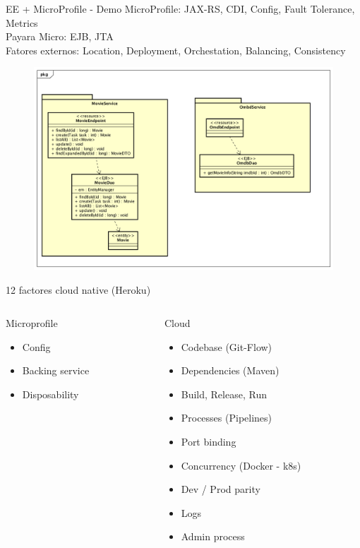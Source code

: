 \documentclass[aspectratio=169]{beamer}
\begin{document}
\begin{frame}{EE + MicroProfile - Demo}
\footnotesize MicroProfile: JAX-RS, CDI, Config, Fault Tolerance, Metrics\\
Payara Micro: EJB, JTA\\
Fatores externos: Location, Deployment, Orchestation, Balancing, Consistency
\begin{figure}
\centering
\includegraphics[width=0.65\linewidth]{Images/demomicro}
\end{figure}
\end{frame}

\begin{frame}{12 factores cloud native (Heroku)}

\begin{columns}[T] %

	\begin{column}[T]{4cm} %
		\begin{alertblock}{Microprofile}
	\begin{itemize}
		\item Config
		\item Backing service
		\item Disposability
	\end{itemize}
\end{alertblock}
	\end{column}
	\begin{column}[T]{6cm} %
		\begin{block}{Cloud}
	\begin{itemize}
	\item Codebase (Git-Flow)
	\item Dependencies (Maven)
	\item Build, Release, Run
	\item Processes (Pipelines)
	\item Port binding
	\item Concurrency (Docker - k8s)
	\item Dev / Prod parity
	\item Logs
	\item Admin process
\end{itemize}
\end{block}
	\end{column}
\end{columns}

\end{frame}
\end{document}
